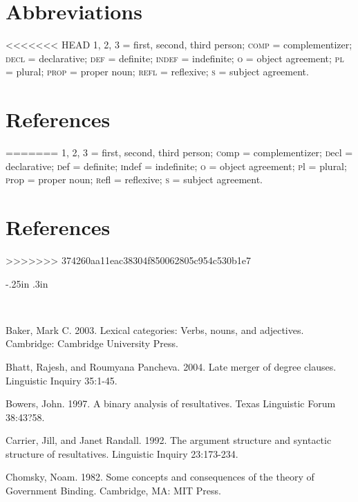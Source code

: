 \documentclass[output=paper]{LSP/langsci}
\begin{document}
\begin{exe}
\begin{exe}
\begin{exe}
\begin{exe}
{\begin{exe}
\section*{Abbreviations}
<<<<<<< HEAD
1, 2, 3 = first, second, third person; \textsc{comp} = complementizer; \textsc{decl} = declarative; \textsc{def} = definite; \textsc{indef} = indefinite; \textsc{o} = object agreement; \textsc{pl} = plural; \textsc{prop} = proper noun; \textsc{refl} = reflexive; \textsc{s} = subject agreement. 

\section*{References}


\printbibliography[heading=subbibliography,notkeyword=this]
=======
1, 2, 3 = first, second, third person; {\textsc comp} = complementizer; {\textsc decl} = declarative; {\textsc def} = definite; {\textsc indef} = indefinite; {\textsc o} = object agreement; {\textsc pl} = plural; {\textsc prop} = proper noun; {\textsc refl} = reflexive; {\textsc s} = subject agreement. 

\section*{References}

\newenvironment{reflist} {\begin{list} {} {\listparindent -.25in
\leftmargin .3in} \item \ \vspace{-.3in} } {\end{list} }
>>>>>>> 374260aa11eac38304f850062805c954c530b1e7

\begin{reflist}

Baker, Mark C. 2003. Lexical categories: Verbs, nouns, and adjectives. Cambridge: Cambridge
University Press.

Bhatt, Rajesh, and Roumyana Pancheva. 2004. Late merger of degree clauses. Linguistic Inquiry 35:1-45.

Bowers, John. 1997. A binary analysis of resultatives. Texas Linguistic Forum 38:43?58.

Carrier, Jill, and Janet Randall. 1992. The argument structure and syntactic structure of resultatives. Linguistic Inquiry 23:173-234.

Chomsky, Noam. 1982. Some concepts and consequences of the theory of Government Binding. Cambridge, MA: MIT Press.


\end{reflist}
\end{exe}}
\end{exe}
\end{exe}
\end{exe}
\end{exe}
\end{document}
